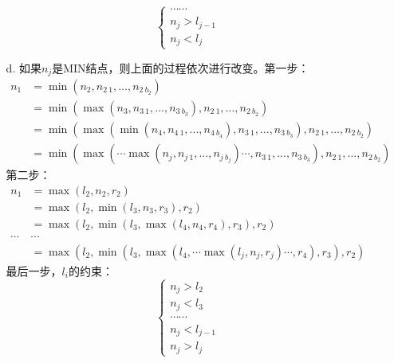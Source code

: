 \documentclass[UTF8,zihao=-4]{ctexart}
\begin{document}
\begin{itemize}
\begin{enumerate}
\begin{equation*}
\begin{cases}
                    \cdots\cdots \\
                    n_j > l_{j-1} \\
                    n_j < l_j
                \end{cases}
            \end{equation*} 
            \item[d.]如果$n_j$是MIN结点，则上面的过程依次进行改变。第一步：
            \begin{align*}
                n_1&=\min(n_2,n_{2\ 1},...,n_{2\ b_2}) \\
                   &=\min(\max(n_3,n_{3\ 1},...,n_{3\ b_3}),n_{2\ 1},...,n_{2\ b_2}) \\
                   &=\min(\max(\min(n_4,n_{4\ 1},...,n_{4\ b_4}),n_{3\ 1},...,n_{3\ b_3}),n_{2\ 1},...,n_{2\ b_2}) \\
                   &=\min(\max(\cdots\max(n_j,n_{j\ 1},...,n_{j\ b_j})\cdots,n_{3\ 1},...,n_{3\ b_3}),n_{2\ 1},...,n_{2\ b_2})
            \end{align*} 
            第二步：
            \begin{align*}
                n_1&=\max(l_2,n_2,r_2)\\
                   &=\max(l_2,\min(l_3,n_3,r_3),r_2)\\
                   &=\max(l_2,\min(l_3,\max(l_4,n_4,r_4),r_3),r_2)\\
                   \cdots&\cdots \\
                   &=\max(l_2,\min(l_3,\max(l_4,\cdots\max(l_j,n_j,r_j)\cdots,r_4),r_3),r_2)
            \end{align*}
            最后一步，$l_i$的约束：
            \begin{equation*}
                \begin{cases}
                    n_j > l_2 \\
                    n_j < l_3 \\
                    \cdots\cdots \\
                    n_j < l_{j-1} \\
                    n_j > l_j
                \end{cases}
            \end{equation*} 
        \end{enumerate}
	\end{itemize}
\end{document}
